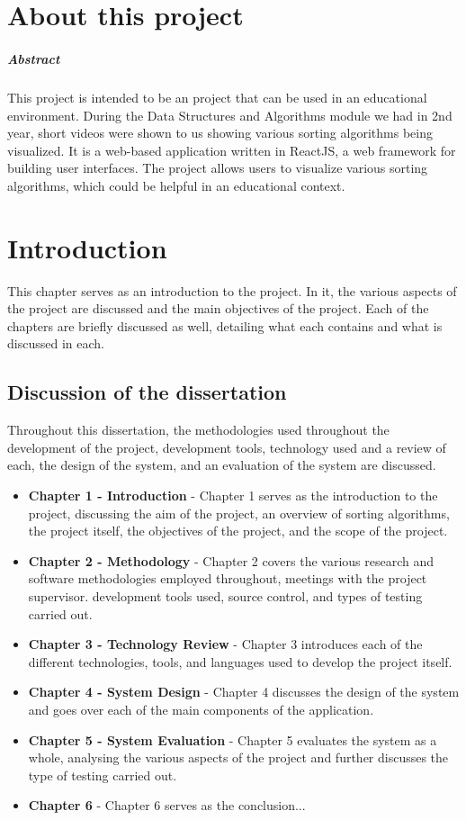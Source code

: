 \chapter*{About this project}
\paragraph{Abstract}
This project is intended to be an project that can be used in an educational 
environment. During the Data Structures and Algorithms module we had in 2nd year,
short videos were shown to us showing various sorting algorithms being 
visualized. It is a web-based application written in ReactJS, a web framework 
for building user interfaces. The project allows users to visualize various
sorting algorithms, which could be helpful in an educational context.

\chapter{Introduction}
This chapter serves as an introduction to the project. In it, the various aspects
of the project are discussed and the main objectives of the project. Each of the 
chapters are briefly discussed as well, detailing what each contains and what is
discussed in each.

\section{Discussion of the dissertation}
Throughout this dissertation, the methodologies used throughout the development of the project, development tools, technology used and a review of each, the design of the system, and an evaluation of the system are discussed.

\begin{itemize}
    \item \textbf{Chapter 1 - Introduction} - Chapter 1 serves as the introduction to the project, discussing the aim of the project, an overview of sorting algorithms, the project itself, the objectives of the project, and the scope of the project.
    \item \textbf{Chapter 2 - Methodology} - Chapter 2 covers the various research and software methodologies employed throughout, meetings with the project supervisor. development tools used, source control, and types of testing carried out.
    \item \textbf{Chapter 3 - Technology Review} - Chapter 3 introduces each of the different technologies, tools, and languages used to develop the project itself.
    \item \textbf{Chapter 4 - System Design} - Chapter 4 discusses the design of the system and goes over each of the main components of the application.
    \item \textbf{Chapter 5 - System Evaluation} - Chapter 5 evaluates the system as a whole, analysing the various aspects of the project and further discusses the type of testing carried out.
    \item \textbf{Chapter 6} - Chapter 6 serves as the conclusion...
\end{itemize}

